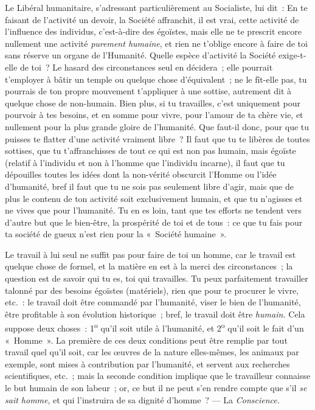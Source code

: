 \documentclass[french,twoside]{book} %
\begin{document}
Le Libéral humanitaire, s’adressant particulièrement au Socialiste, lui dit : En te faisant de l’activité un devoir, la Société affranchit, il est vrai, cette activité de l’influence des individus, c’est-à-dire des égoïstes, mais elle ne te prescrit encore nullement une activité \emph{purement humaine}, et rien ne t’oblige encore à faire de toi sans réserve un organe de l’Humanité. Quelle espèce d’activité la Société exige-t-elle de toi ? Le hasard des circonstances seul en décidera ; elle pourrait t’employer à bâtir un temple ou quelque chose d’équivalent ; ne le fît-elle pas, tu pourrais de ton propre mouvement t’appliquer à une sottise, autrement dit à quelque chose de non-humain. Bien plus, si tu travailles, c’est uniquement pour pourvoir à tes besoins, et en somme pour vivre, pour l’amour de ta chère vie, et nullement pour la plus grande gloire de l’humanité. Que faut-il donc, pour que tu puisses te flatter d’une activité vraiment libre ? Il faut que tu te libères de toutes sottises, que tu t’affranchisses de tout ce qui est non pas humain, mais égoïste (relatif à l’individu et non à l’homme que l’individu incarne), il faut que tu dépouilles toutes les idées dont la non-vérité obscurcit l’Homme ou l’idée d’humanité, bref il faut que tu ne sois pas seulement libre d’agir, mais  que de plus le contenu de ton activité soit exclusivement humain, et que tu n’agisses et ne vives que pour l’humanité. Tu en es loin, tant que tes efforts ne tendent vers d’autre but que le bien-être, la prospérité de toi et de tous : ce que tu fais pour ta société de gueux n’est rien pour la « Société humaine ».\par
Le travail à lui seul ne suffit pas pour faire de toi un homme, car le travail est quelque chose de formel, et la matière en est à la merci des circonstances ; la question est de savoir qui tu es, toi qui travailles. Tu peux parfaitement travailler talonné par des besoins égoïstes (matériels), rien que pour te procurer le vivre, etc. : le travail doit être commandé par l’humanité, viser le bien de l’humanité, être profitable à son évolution historique ; bref, le travail doit être \emph{humain.} Cela suppose deux choses : 1\textsuperscript{o} qu’il soit utile à l’humanité, et 2\textsuperscript{o} qu’il soit le fait d’un « Homme ». La première de ces deux conditions peut être remplie par tout travail quel qu’il soit, car les œuvres de la nature elles-mêmes, les animaux par exemple, sont mises à contribution par l’humanité, et servent aux recherches scientifiques, etc. ; mais la seconde condition implique que le travailleur connaisse le but humain de son labeur ; or, ce but il ne peut s’en rendre compte que s’il \emph{se sait homme}, et qui l’instruira de sa dignité d’homme ? — La \emph{Conscience.}\par
\end{document}
